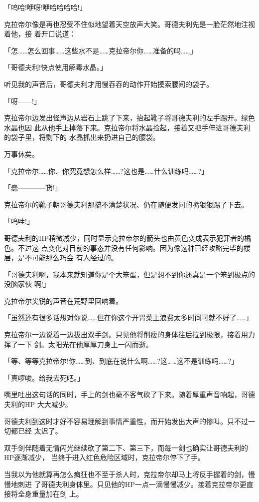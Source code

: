 \documentclass[11pt]{book}
\begin{document}
「呜哈!咿呀!咿哈哈哈哈!」

克拉帝尔像是再也忍受不住似地望着天空放声大笑。哥德夫利先是一脸茫然地注视着他，接
着开口说道：

「怎……怎么回事……这些水不是……克拉帝尔你……准备的吗……」

「哥德夫利!快点使用解毒水晶。」

听见我的声音后，哥德夫利才用慢吞吞的动作开始摸索腰间的袋子。

「呀——!」

克拉帝尔边发出怪声边从岩石上跳了下来，抬起靴子将哥德夫利的左手踢开。绿色水晶也因
此从他手上掉落下来。克拉帝尔将水晶捡起，接着又把手伸进哥德夫利的袋子里，将剩下的
水晶抓出来扔进自己的腰袋。

万事休矣。

「克拉帝尔……你、你究竟想怎么样……?这也是……什么训练吗……?」

「蠢————货!」

克拉帝尔的靴子朝哥德夫利那搞不清楚状况、仍在随便发问的嘴狠狠踢了下去。

「呜哇!」

哥德夫利的HP稍微减少，同时显示克拉帝尔的箭头也由黄色变成表示犯罪者的橘色。不过这
点变化对目前的事态并没有任何影响。因为像这种已经攻略完毕的楼层，是不可能那么巧会
有人经过的。

「哥德夫利啊，我本来就知道你是个大笨蛋，但是想不到你还真是一个笨到极点的没脑家伙
啊!」

克拉帝尔尖锐的声音在荒野里回响着。

「虽然还有很多话想对你说……但在你这个开胃菜上浪费太多时间可就不好了……」

克拉帝尔一边说着一边拔出双手剑。只见他将削瘦的身体往后拉到极限，接着用力挥了一下
剑。太阳光在他厚厚刀身上一闪而逝。

「等、等等克拉帝尔!你……到、到底在说什么啊……?这……这不是训练吗……?」

「真啰唆。给我去死吧。」

嘴里吐出这句话的同时，手上的剑也毫不客气砍了下来。随着厚重声音响起，哥德夫利的HP
大大减少。

哥德夫利到这时才好不容易理解到事情严重性，而开始发出大声的惨叫。只不过一切都已经
太迟了。

双手剑伴随着无情闪光继续砍了第二下、第三下，而每一剑也确实让哥德夫利的HP逐渐减少，
当终于进入红色危险区域时，克拉帝尔停下了手。

当我以为他就算再怎么疯狂也不至于杀人时，克拉帝尔却马上将反手握着的剑，慢慢地刺进
了哥德夫利身体里。只见他的HP一点一滴慢慢减少。接着克拉帝尔更直接将全身重量加在剑
上。
\end{document}
